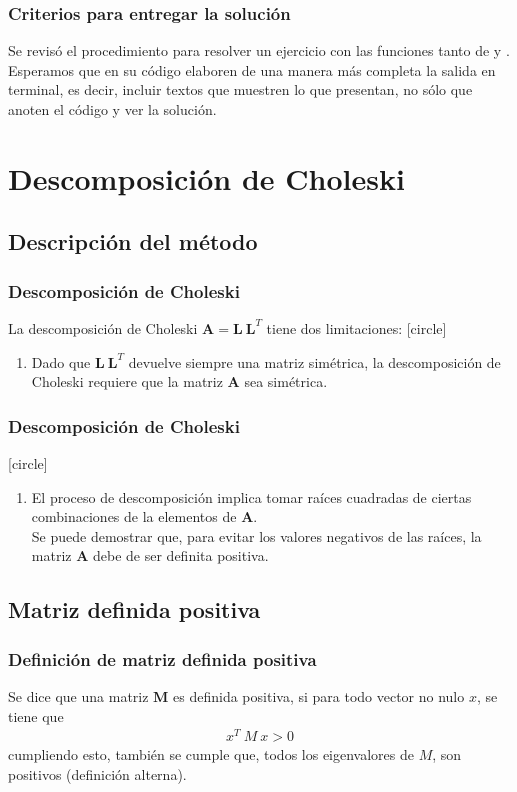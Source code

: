 \begin{frame}
\frametitle{Criterios para entregar la solución}
Se revisó el procedimiento para resolver un ejercicio con las funciones tanto de  y .
\\
\bigskip
Esperamos que en su código elaboren de una manera más completa la salida en terminal, es decir, incluir textos que muestren lo que presentan, no sólo que anoten el código y ver la solución.
\end{frame}
\section{Descomposición de Choleski}
\subsection{Descripción del método}
\begin{frame}
\frametitle{Descomposición de Choleski}
La descomposición de Choleski $\mathbf{A = L \: L}^{T}$ tiene dos limitaciones:
[circle]
\begin{enumerate}[<+->]
\item Dado que $\mathbf{L \: L}^{T}$ devuelve siempre una matriz simétrica, la descomposición de Choleski requiere que la matriz $\mathbf{A}$ sea simétrica.
\seti
\end{enumerate}
\end{frame}
\begin{frame}
\frametitle{Descomposición de Choleski}
[circle]
\begin{enumerate}[<+->]
\conti
\item El proceso de descomposición implica tomar raíces cuadradas de ciertas combinaciones de la elementos de $\mathbf{A}$.
\\
\bigskip
Se puede demostrar que, para evitar los valores negativos de las raíces, la matriz $\mathbf{A}$ debe de ser definita positiva.
\end{enumerate}
\end{frame}
\subsection*{Matriz definida positiva}
\begin{frame}
\frametitle{Definición de matriz definida positiva}
Se dice que una matriz $\mathbf{M}$ es definida positiva, si para todo vector no nulo $x$, se tiene que
\begin{align*}
x^{T} \: M \: x > 0
\end{align*}
cumpliendo esto, también se cumple que, todos los eigenvalores de $M$, son positivos (definición alterna).
\end{frame}

